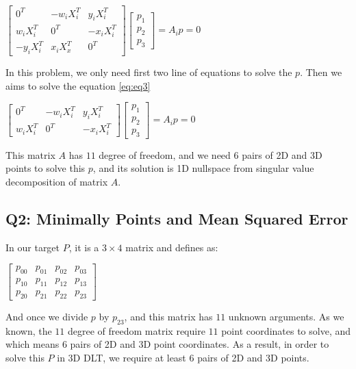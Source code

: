 \documentclass[12pt]{article}
\begin{document}
\begin{center}
\label{eq:eq2}
$\begin{bmatrix} 0^{T} & - w_{i}X_{i}^{T} & y_{i}X_{i}^{T} \\ w_{i}X_{i}^{T} & 0^{T} & - x_{i}X_{i}^{T} \\ -y_{i}X_{i}^{T} & x_{i}X_{x}^{T} & 0^{T} \end{bmatrix} \begin{bmatrix}
p_{1} \\ p_{2} \\ p_{3} \end{bmatrix} = A_{i}p = 0$
\end{center}

In this problem, we only need first two line of equations to solve the $p$. Then we aims to solve the equation \ref{eq:eq3}
\begin{center}
\label{eq:eq3}
$\begin{bmatrix} 0^{T} & - w_{i}X_{i}^{T} & y_{i}X_{i}^{T} \\ w_{i}X_{i}^{T} & 0^{T} & - x_{i}X_{i}^{T}\end{bmatrix} \begin{bmatrix}
p_{1} \\ p_{2} \\ p_{3} \end{bmatrix} = A_{i}p = 0$
\end{center}

This matrix $A$ has $11$ degree of freedom, and we need $6$ pairs of 2D and 3D points to solve this $p$, and its solution is 1D nullspace from singular value decomposition of matrix $A$.

\subsection{Q2: Minimally Points and Mean Squared Error}

In our target $P$, it is a $3 \times 4$ matrix and defines as:

\begin{center}
$\begin{bmatrix} p_{00} & p_{01} & p_{02} & p_{03} \\  p_{10} & p_{11} & p_{12} & p_{13} \\  p_{20} & p_{21} & p_{22} & p_{23} \end{bmatrix}$
\end{center}

And once we divide $p$ by $p_{23}$, and this matrix has $11$ unknown arguments. As we known, the $11$ degree of freedom matrix require $11$ point coordinates to solve, and which means $6$ pairs of 2D and 3D point coordinates. As a result, in order to solve this $P$ in 3D DLT, we require at least $6$ pairs of 2D and 3D points.
\end{document}
